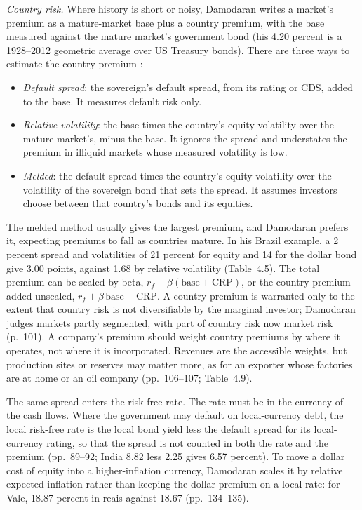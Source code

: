\begin{qfmethod}
\emph{Country risk.} Where history is short or noisy, Damodaran writes a market's premium as a mature-market base plus a country premium, with the base measured against the mature market's government bond (his 4.20 percent is a 1928--2012 geometric average over US Treasury bonds). There are three ways to estimate the country premium \citep[pp.~98--100]{applied-corporate-finance-2014}:
\begin{itemize}
\item \emph{Default spread}: the sovereign's default spread, from its rating or CDS, added to the base. It measures default risk only.
\item \emph{Relative volatility}: the base times the country's equity volatility over the mature market's, minus the base. It ignores the spread and understates the premium in illiquid markets whose measured volatility is low.
\item \emph{Melded}: the default spread times the country's equity volatility over the volatility of the sovereign bond that sets the spread. It assumes investors choose between that country's bonds and its equities.
\end{itemize}
The melded method usually gives the largest premium, and Damodaran prefers it, expecting premiums to fall as countries mature. In his Brazil example, a 2 percent spread and volatilities of 21 percent for equity and 14 for the dollar bond give 3.00 points, against 1.68 by relative volatility (Table~4.5). The total premium can be scaled by beta, $r_f+\beta(\text{base}+\text{CRP})$, or the country premium added unscaled, $r_f+\beta\,\text{base}+\text{CRP}$. A country premium is warranted only to the extent that country risk is not diversifiable by the marginal investor; Damodaran judges markets partly segmented, with part of country risk now market risk (p.~101). A company's premium should weight country premiums by where it operates, not where it is incorporated. Revenues are the accessible weights, but production sites or reserves may matter more, as for an exporter whose factories are at home or an oil company (pp.~106--107; Table~4.9).

The same spread enters the risk-free rate. The rate must be in the currency of the cash flows. Where the government may default on local-currency debt, the local risk-free rate is the local bond yield less the default spread for its local-currency rating, so that the spread is not counted in both the rate and the premium (pp.~89--92; India 8.82 less 2.25 gives 6.57 percent). To move a dollar cost of equity into a higher-inflation currency, Damodaran scales it by relative expected inflation rather than keeping the dollar premium on a local rate: for Vale, 18.87 percent in reais against 18.67 (pp.~134--135).


\end{qfmethod}
